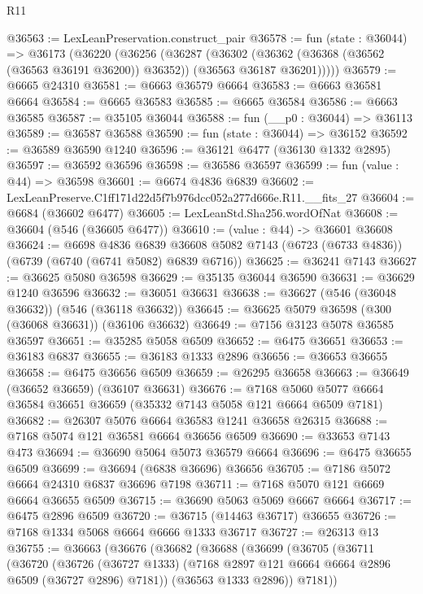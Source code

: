 \begin{lexlean}{R11}
\begin{coremodule}
@36563 := LexLeanPreservation.construct_pair
@36578 := fun (state : @36044) =>
  @36173
    (@36220
      (@36256
        (@36287
          (@36302
            (@36362 (@36368 (@36562 (@36563 @36191 @36200)) @36352))
            (@36563 @36187 @36201)))))
@36579 := @6665 @24310
@36581 := @6663 @36579 @6664
@36583 := @6663 @36581 @6664
@36584 := @6665 @36583
@36585 := @6665 @36584
@36586 := @6663 @36585
@36587 := @35105 @36044
@36588 := fun (__p0 : @36044) => @36113
@36589 := @36587 @36588
@36590 := fun (state : @36044) => @36152
@36592 := @36589 @36590 @1240
@36596 := @36121 @6477 (@36130 @1332 @2895)
@36597 := @36592 @36596
@36598 := @36586 @36597
@36599 := fun (value : @44) => @36598
@36601 := @6674 @4836 @6839
@36602 := LexLeanPreserve.C1ff171d22d5f7b976dcc052a277d666e.R11.__fits_27
@36604 := @6684 (@36602 @6477)
@36605 := LexLeanStd.Sha256.wordOfNat
@36608 := @36604 (@546 (@36605 @6477))
@36610 := (value : @44) -> @36601 @36608
@36624 := @6698
    @4836
    @6839
    @36608
    @5082
    @7143
    (@6723 (@6733 @4836))
    (@6739 (@6740 (@6741 @5082) @6839 @6716))
@36625 := @36241 @7143
@36627 := @36625 @5080 @36598
@36629 := @35135 @36044 @36590
@36631 := @36629 @1240 @36596
@36632 := @36051 @36631
@36638 := @36627 (@546 (@36048 @36632)) (@546 (@36118 @36632))
@36645 := @36625 @5079 @36598 (@300 (@36068 @36631)) (@36106 @36632)
@36649 := @7156 @3123 @5078 @36585 @36597
@36651 := @35285 @5058 @6509
@36652 := @6475 @36651
@36653 := @36183 @6837
@36655 := @36183 @1333 @2896
@36656 := @36653 @36655
@36658 := @6475 @36656 @6509
@36659 := @26295 @36658
@36663 := @36649 (@36652 @36659) (@36107 @36631)
@36676 := @7168 @5060 @5077 @6664 @36584 @36651 @36659 (@35332 @7143 @5058 @121 @6664 @6509 @7181)
@36682 := @26307 @5076 @6664 @36583 @1241 @36658 @26315
@36688 := @7168 @5074 @121 @36581 @6664 @36656 @6509
@36690 := @33653 @7143 @473
@36694 := @36690 @5064 @5073 @36579 @6664
@36696 := @6475 @36655 @6509
@36699 := @36694 (@6838 @36696) @36656
@36705 := @7186 @5072 @6664 @24310 @6837 @36696 @7198
@36711 := @7168 @5070 @121 @6669 @6664 @36655 @6509
@36715 := @36690 @5063 @5069 @6667 @6664
@36717 := @6475 @2896 @6509
@36720 := @36715 (@14463 @36717) @36655
@36726 := @7168 @1334 @5068 @6664 @6666 @1333 @36717
@36727 := @26313 @13
@36755 := @36663
    (@36676
      (@36682
        (@36688
          (@36699
            (@36705
              (@36711
                (@36720
                  (@36726
                    (@36727 @1333)
                    (@7168 @2897 @121 @6664 @6664 @2896 @6509 (@36727 @2896) @7181))
                  (@36563 @1333 @2896))
                @7181))

\end{coremodule}
\end{lexlean}
